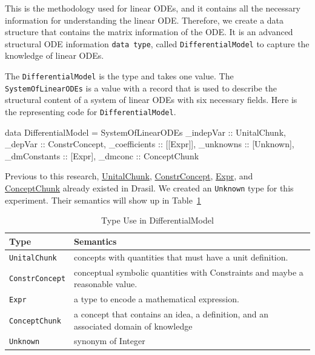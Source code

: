 This is the methodology used for linear ODEs, and it contains all the necessary information for understanding the linear ODE. Therefore, we create a data structure that contains the matrix information of the ODE. It is an advanced structural ODE information \verb|data type|, called \verb|DifferentialModel| to capture the knowledge of linear ODEs.

The \verb|DifferentialModel| is the type and takes one value. The \verb|SystemOfLinearODEs| is a value with a record that is used to describe the structural content of a system of linear ODEs with six necessary fields. Here is the representing code for \verb|DifferentialModel|.
\begin{haskell1}
data DifferentialModel = SystemOfLinearODEs {
	_indepVar :: UnitalChunk,
	_depVar :: ConstrConcept,
	_coefficients :: [[Expr]],
	_unknowns :: [Unknown],
	_dmConstants :: [Expr],
	_dmconc :: ConceptChunk
}
\end{haskell1}

Previous to this research, \href{https://jacquescarette.github.io/Drasil/docs/full/drasil-lang-0.1.60.0/Language-Drasil-Chunk-Unital.html#t:UnitalChunk}{UnitalChunk}, \href{https://jacquescarette.github.io/Drasil/docs/full/drasil-lang-0.1.60.0/Language-Drasil-Chunk-Constrained.html#t:ConstrConcept}{ConstrConcept}, \href{https://jacquescarette.github.io/Drasil/docs/full/drasil-lang-0.1.60.0/Language-Drasil-Expr-Lang.html#t:Expr}{Expr}, and \href{https://jacquescarette.github.io/Drasil/docs/full/drasil-lang-0.1.60.0/Language-Drasil-Chunk-Concept-Core.html#t:ConceptChunk}{ConceptChunk} already existed in Drasil. We created an \verb|Unknown| type for this experiment. Their semantics will show up in Table~\ref{tab_demodeltype}
\begin{table}[ht]
	\begin{tabular}{ p{} p{} }
		\textbf{Type} & \textbf{Semantics} \\
		\toprule
		\verb|UnitalChunk| & concepts with quantities that must have a unit definition.\\
		\verb|ConstrConcept| & conceptual symbolic quantities with Constraints and maybe a reasonable value.\\
		\verb|Expr| & a type to encode a mathematical expression. \\
		\verb|ConceptChunk| & a concept that contains an idea, a definition, and an associated domain of knowledge\\
        \verb|Unknown|& synonym of Integer\\
		\bottomrule	
	\end{tabular}	
	\caption{Type Use in DifferentialModel}	
	\label{tab_demodeltype}
\end{table}


